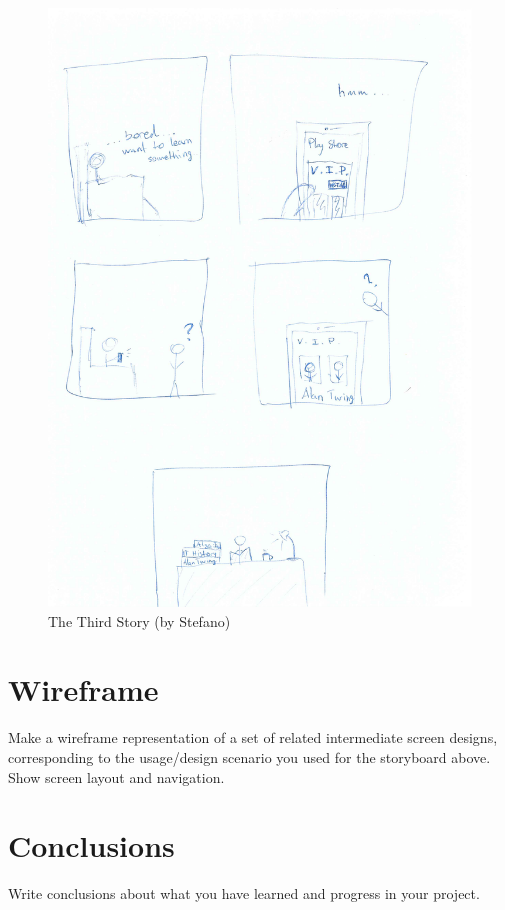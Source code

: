 \documentclass[12pt]{scrartcl}
\begin{document}
	\begin{figure}[H]
        		\centering
       		\includegraphics[width=\textwidth]{sketches/story3.pdf}
       		\caption{The Third Story (by Stefano)}
        		\label{story3}
	\end{figure}
	

\section{Wireframe}

	Make a wireframe representation of a set of related intermediate screen designs, corresponding to the usage/design scenario you used for the storyboard above.  Show screen layout and navigation.
	
\section{Conclusions}

	Write conclusions about what you have learned and progress in your project.
\end{document}
